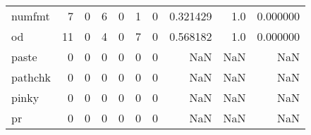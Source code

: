 \begin{tabular}{lrrrrrrrrr}
numfmt    &                                                  7 &                                                  0 &                                                  6 &                                                  0 &                                                  1 &                                                  0 &                                           0.321429 &                                    1.0 &                             0.000000 \\
od        &                                                 11 &                                                  0 &                                                  4 &                                                  0 &                                                  7 &                                                  0 &                                           0.568182 &                                    1.0 &                             0.000000 \\
paste     &                                                  0 &                                                  0 &                                                  0 &                                                  0 &                                                  0 &                                                  0 &                                                NaN &                                    NaN &                                  NaN \\
pathchk   &                                                  0 &                                                  0 &                                                  0 &                                                  0 &                                                  0 &                                                  0 &                                                NaN &                                    NaN &                                  NaN \\
pinky     &                                                  0 &                                                  0 &                                                  0 &                                                  0 &                                                  0 &                                                  0 &                                                NaN &                                    NaN &                                  NaN \\
pr        &                                                  0 &                                                  0 &                                                  0 &                                                  0 &                                                  0 &                                                  0 &                                                NaN &                                    NaN &                                  NaN \\

\end{tabular}
